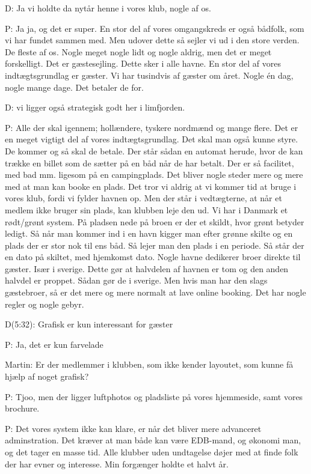 D: Ja vi holdte da nytår henne i vores klub, nogle af os.

P: Ja ja, og det er super. En stor del af vores omgangskreds er også bådfolk, som vi har fundet sammen med. Men udover dette så sejler vi ud i den store verden. De fleste af os. Nogle meget nogle lidt og nogle aldrig, men det er meget forskelligt. Det er gæstesejling. Dette sker i alle havne. En stor del af vores indtægtsgrundlag er gæster. Vi har tusindvis af gæster om året. Nogle én dag, nogle mange dage. Det betaler de for.

D: vi ligger også strategisk godt her i limfjorden.

P: Alle der skal igennem; hollændere, tyskere nordmænd og mange flere. Det er en meget vigtigt del af vores indtægtsgrundlag. Det skal man også kunne styre. De kommer og så skal de betale. Der står sådan en automat herude, hvor de kan trække en billet som de sætter på en båd når de har betalt. Der er så facilitet, med bad mm. ligesom på en campingplads. Det bliver nogle steder mere og mere med at man kan booke en plads. Det tror vi aldrig at vi kommer tid at bruge i vores klub, fordi vi fylder havnen op. Men der står i vedtægterne, at når et medlem ikke bruger sin plads, kan klubben leje den ud. Vi har i Danmark et rødt/grønt system. På pladsen nede på broen er der et skildt, hvor grønt betyder ledigt. Så når man kommer ind i en havn kigger man efter grønne skilte og en plads der er stor nok til ens båd. Så lejer man den plads i en periode. Så står der en dato på skiltet, med hjemkomst dato.
Nogle havne dedikerer broer direkte til gæster. Især i sverige. Dette gør at halvdelen af havnen er tom og den anden halvdel er proppet. Sådan gør de i sverige. Men hvis man har den slags gæstebroer, så er det mere og mere normalt at lave online booking. Det har nogle regler og nogle gebyr.

D(5:32): Grafisk er kun interessant for gæster

P: Ja, det er kun farvelade

Martin: Er der medlemmer i klubben, som ikke kender layoutet, som kunne få hjælp af noget grafisk?

P: Tjoo, men der ligger luftphotos og pladsliste på vores hjemmeside, samt vores brochure.

P: Det vores system ikke kan klare, er når det bliver mere advanceret adminstration. Det kræver at man både kan være EDB-mand, og økonomi man, og det tager en masse tid. Alle klubber uden undtagelse døjer med at finde folk der har evner og interesse. Min forgænger holdte et halvt år.

